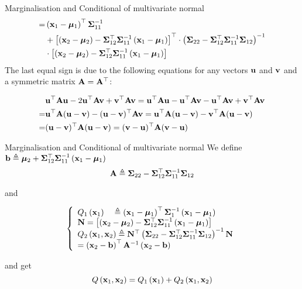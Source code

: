 \documentclass{beamer}
\begin{document}
\begin{frame}{Marginalisation and Conditional of multivariate normal}
	\footnotesize
	\begin{gather}
	\begin{aligned}
	=&\left(\vx_{1}-\vmu_{1}\right)\tp \mSigma_{11}\inv\\
	&+\left[\left(\vx_{2}-\vmu_{2}\right)-\mSigma_{12}\tp \mSigma_{11}\inv\left(\vx_{1}-\vmu_{1}\right)\right]\tp \cdot \left(\mSigma_{22}-\mSigma_{12}\tp \mSigma_{11}\inv \mSigma_{12}\right)\inv \\
    & \cdot \left[\left(\vx_{2}-\vmu_{2}\right)-\mSigma_{12}\tp \mSigma_{11}\inv\left(\vx_{1}-\vmu_{1}\right)\right]
	\end{aligned}
	\end{gather}
	\normalsize
	The last equal sign is due to the following equations for any vectors $\vu$ and $\vv$ and a symmetric matrix $\mA=\mA\tp$:
	
	\begin{gather}
	\begin{aligned}
	& \vu\tp \mA \vu-2 \vu\tp \mA \vv+\vv\tp \mA \vv=\vu\tp \mA \vu-\vu\tp \mA \vv-\vu\tp \mA \vv+\vv\tp \mA \vv \\
	=& \vu\tp \mA (\vu-\vv)-(\vu-\vv)\tp \mA \vv=\vu\tp \mA (\vu-\vv)-\vv\tp \mA (\vu-\vv) \\
	=&(\vu-\vv)\tp \mA (\vu-\vv)=(\vv-\vu)\tp \mA (\vv-\vu)
	\end{aligned}
	\end{gather}
\end{frame}

\begin{frame}{Marginalisation and Conditional of multivariate normal}
	We define  \\
	$\vb \triangleq \vmu_{2}+\mSigma_{12}\tp \mSigma_{11}\inv\left(\vx_{1}-\vmu_{1}\right)$
	\[
	\mA \triangleq \mSigma_{22}-\mSigma_{12}\tp \mSigma_{11}\inv \mSigma_{12}
	\]
	
	and 

	$$\left\{\begin{array}{l}{Q_{1}\left(\vx_{1}\right) \quad \triangleq\left(\vx_{1}-\vmu_{1}\right)\tp \mSigma_{1}\inv\left(\vx_{1}-\vmu_{1}\right)} \\ 
		{\mN=\left[\left(\vx_{2}-\vmu_{2}\right)-\mSigma_{12}\tp \mSigma_{11}\inv\left(\vx_{1}-\vmu_{1}\right)\right]} \\
		{Q_{2}\left(\vx_{1}, \vx_{2}\right) \triangleq \mN\tp\left(\mSigma_{22}-\mSigma_{12}\tp \mSigma_{11}\inv \mSigma_{12}\right)\inv \mN} \\
		{=\left(\vx_{2}-\vb\right)\tp \mA\inv\left(\vx_{2}-\vb\right)}\end{array}\right.$$

	and get 
	$$Q\left(\vx_{1}, \vx_{2}\right)=Q_{1}\left(\vx_{1}\right)+Q_{2}\left(\vx_{1}, \vx_{2}\right)$$
\end{frame}
\end{document}
